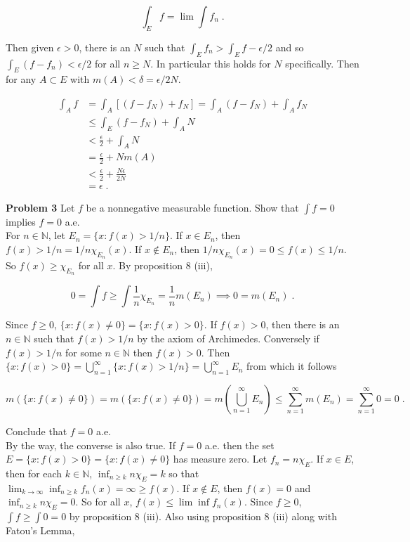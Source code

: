 \documentclass[a4paper]{article}
\begin{document}
$$\int_E f = \lim \int f_n \;.$$

Then given $\epsilon > 0$, there is an $N$ such that $\int_E f_n > \int_E f - \epsilon /2$ and so $\int_E (f - f_n) < \epsilon /2 $ for all $n\geq N$. In particular this holds for $N$ specifically. Then for any $A \subset E$ with $m(A) < \delta = \epsilon / 2N$.

\begin{align*}
\int_A f &= \int_A [(f - f_N) + f_N] = \int_A (f-f_N) + \int_A f_N\\
&\leq \int_E (f-f_N) + \int_A N \\
&< \frac{\epsilon}{2} + \int_A N \\
&= \frac{\epsilon}{2} + Nm(A)\\
&< \frac{\epsilon}{2}+ \frac{N\epsilon}{2N}\\
&= \epsilon \;.
\end{align*}

{\bf Problem 3} Let $f$ be a nonnegative measurable function. Show that $\int f = 0$ implies $f = 0$ a.e. \\

For $n \in \mathbb{N}$, let $E_n = \{x : f(x) > 1/n\}$. If $x \in E_n$, then $f(x) > 1/n = 1/n \chi_{E_n}(x)$. If $x \not \in E_n$, then $1/n\chi_{E_n}(x)= 0  \leq f(x) \leq 1/n$. So $f(x) \geq \chi_{E_n}$ for all $x$. By proposition 8 (iii),

$$ 0 = \int f \geq \int \frac{1}{n}\chi_{E_n} = \frac{1}{n}m(E_n) \implies 0 = m(E_n) \;.$$

Since $f \geq 0$, $\{x : f(x) \neq 0 \} = \{x : f(x) > 0\}$. If $f(x) > 0$, then there is an $n\in \mathbb{N}$ such that $f(x) > 1/n$ by the axiom of Archimedes. Conversely if $f(x) > 1/n$ for some $n \in \mathbb{N}$ then $f(x) > 0 $. Then $\{x : f(x) > 0 \} = \bigcup_{n=1}^\infty \{x : f(x) > 1/n\} = \bigcup_{n=1}^\infty E_n$ from which it follows

$$m\left(\{x : f(x) \neq 0\}\right) = m\left(\{x : f(x) \neq 0\}\right) = m\left(\bigcup_{n=1}^\infty E_n \right) \leq \sum_{n=1}^\infty m(E_n)  = \sum_{n=1}^\infty 0 = 0 \;.$$

Conclude that $f = 0$ a.e.\\

By the way, the converse is also true. If $f = 0$ a.e. then the set $E = \{x : f(x) > 0 \} = \{x : f(x) \neq 0\}$ has measure zero. Let $f_n = n \chi_{E}$. If $x \in E$, then for each $k \in \mathbb{N}$, $\inf_{n\geq k} n \chi_E = k$ so that $\lim_{k\rightarrow \infty} \inf_{n\geq k} f_n(x) = \infty \geq f(x)$. If $x \not \in E$, then $f(x) = 0$ and $\inf_{n\geq k} n\chi_E = 0$. So for all $x$, $f(x) \leq \lim \inf f_n(x)$. Since $f \geq 0$, $\int f \geq \int 0 = 0$ by proposition 8 (iii). Also using proposition 8 (iii) along with Fatou's Lemma,
\end{document}

